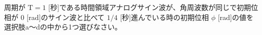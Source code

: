 周期が $\textrm{T}=1$ [秒]である時間領域アナログサイン波が、角周波数が同じで初期位相が $0$ [rad]のサイン波と比べて $1/4$ [秒]進んでいる時の初期位相 $\phi$ [rad]の値を選択肢a〜dの中から1つ選びなさい。
